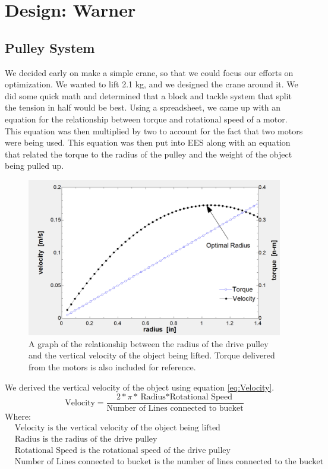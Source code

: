 \documentclass[letterpaper, 12pt]{article}
\begin{document}
\section{Design: Warner}

\subsection{Pulley System}
\label{sec:Pulley}
We decided early on make a simple crane, so that we could focus our efforts on optimization.
We wanted to lift 2.1 kg, and we designed the crane around it. 
We did some quick math and determined that a block and tackle system that split the tension in half would be best. 
Using a spreadsheet, we came up with an equation for the relationship between torque and rotational speed of a motor. 
This equation was then multiplied by two to account for the fact that two motors were being used. 
This equation was then put into EES along with an equation that related the torque to the radius of the pulley and the weight of the object being pulled up.

\begin{figure}[H]
    \centering
    \includegraphics[width =.45\linewidth]{Torque_Speed.png}
    \caption{A graph of the relationship between the radius of the drive pulley and the vertical velocity of the object being lifted. Torque delivered from the motors is also included for reference.}
    \label{fig:Torque_Speed}
\end{figure}

We derived the vertical velocity of the object using equation \ref{eq:Velocity}.
\begin{equation}
    \label{eq:Velocity}
    \text{Velocity}=\frac{2*\pi*{\text{Radius}*\text{Rotational Speed}}}{\text{Number of Lines connected to bucket}}
\end{equation}
Where:
\begin{equation}
    \begin{split}
       & \text{Velocity} \text{ is the vertical velocity of the object being lifted} \\
        &\text{Radius}  \text{ is the radius of the drive pulley} \\
        &\text{Rotational Speed}  \text{ is the rotational speed of the drive pulley} \\
        &\text{Number of Lines connected to bucket}  \text{ is the number of lines connected to the bucket}
    \end{split}
\end{equation}
\end{document}
